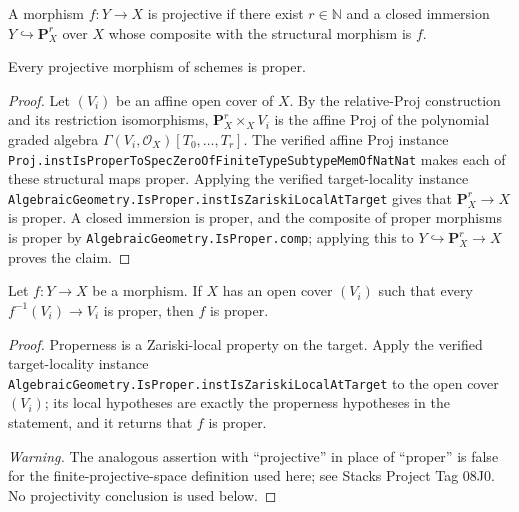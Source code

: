 \begin{definition}
  \label{def:nagata-projective-morphism}

  A morphism $f\colon Y\to X$ is projective if there exist $r\in\mathbb N$
  and a closed immersion $Y\hookrightarrow\mathbf P^r_X$ over $X$ whose
  composite with the structural morphism is $f$.
\end{definition}

\begin{lemma}
  \label{lemma:nagata-projective-is-proper}

  Every projective morphism of schemes is proper.
\end{lemma}

\begin{proof}
  Let $(V_i)$ be an affine open cover of $X$.  By the relative-Proj
  construction and its restriction isomorphisms,
  $\mathbf P^r_X\times_XV_i$ is the affine Proj of the polynomial graded
  algebra $\Gamma(V_i,\mathcal O_X)[T_0,\ldots,T_r]$.  The verified affine
  Proj instance
  \texttt{Proj.instIsProperToSpecZeroOfFiniteTypeSubtypeMemOfNatNat} makes
  each of these structural maps proper.  Applying the verified target-locality
  instance \texttt{AlgebraicGeometry.IsProper.instIsZariskiLocalAtTarget}
  gives that $\mathbf P^r_X\to X$ is proper.  A closed immersion is proper, and the
  composite of proper morphisms is proper by
  \texttt{AlgebraicGeometry.IsProper.comp}; applying this to
  $Y\hookrightarrow\mathbf P^r_X\to X$ proves the claim.
\end{proof}

\begin{lemma}
  \label{lemma:nagata-projective-target-local}

  Let $f\colon Y\to X$ be a morphism.  If $X$ has an open cover
  $(V_i)$ such that every $f^{-1}(V_i)\to V_i$ is proper, then $f$ is
  proper.
\end{lemma}

\begin{proof}
  Properness is a Zariski-local property on the target.  Apply the verified
  target-locality instance
  \texttt{AlgebraicGeometry.IsProper.instIsZariskiLocalAtTarget} to the open
  cover $(V_i)$; its local hypotheses are exactly the properness hypotheses in
  the statement, and it returns that $f$ is proper.

  \emph{Warning.}  The analogous assertion with ``projective'' in place of
  ``proper'' is false for the finite-projective-space definition used here;
  see Stacks Project Tag 08J0.  No projectivity conclusion is used below.
\end{proof}

